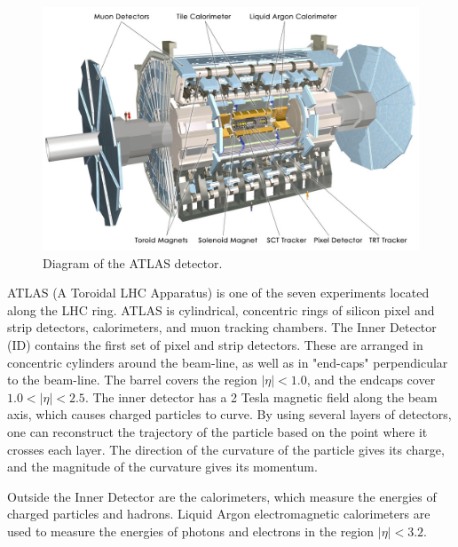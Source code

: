 \documentclass[10pt]{ucscthesisbs}
\begin{document}
\begin{figure}
\includegraphics[width=\textwidth]{images/ATLAS_diagram}
\caption{Diagram of the ATLAS detector.\cite{ATLASDiagram}}
\end{figure}
ATLAS (A Toroidal LHC Apparatus) is one of the seven experiments located along the LHC ring. ATLAS is cylindrical, concentric rings of silicon pixel and strip detectors, calorimeters, and muon tracking chambers. The Inner Detector (ID) contains the first set of pixel and strip detectors. These are arranged in concentric cylinders around the beam-line, as well as in "end-caps" perpendicular to the beam-line. The barrel covers the region $|\eta| < 1.0$, and the endcaps cover $1.0 < |\eta| < 2.5$. The inner detector has a 2 Tesla magnetic field along the beam axis, which causes charged particles to curve. By using several layers of detectors, one can reconstruct the trajectory of the particle based on the point where it crosses each layer. The direction of the curvature of the particle gives its charge, and the magnitude of the curvature gives its momentum. \par
Outside the Inner Detector are the calorimeters, which measure the energies of charged particles and hadrons. Liquid Argon electromagnetic calorimeters are used to measure the energies of photons and electrons in the region $|\eta| < 3.2$. 
\end{document}
